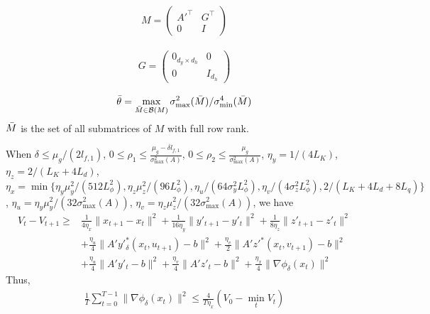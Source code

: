 \documentclass[10pt,a4paper]{amsart}
\begin{document}
\begin{lemma}
\begin{align*}
   M =
    \begin{pmatrix}
        A'^\top & G^\top \\
        0 & I
    \end{pmatrix}
\end{align*}

\begin{align*}
   G =
    \begin{pmatrix}
        0_{d_y\times d_h} & 0 \\
        0 & I_{d_h}
    \end{pmatrix}
\end{align*}

\begin{align*}
    \Bar{\theta}=\max_{\Bar{M}\in \mathcal{B}(M)}\sigma^2_{\max}(\Bar{M})/\sigma^4_{\min}(\Bar{M})
\end{align*}
$\Bar{M}$ is the set of all submatrices of $M$ with full row rank.
\end{lemma}

\begin{lemma}
    When  $\delta\leq \mu_g/(2l_{f,1})$, $0\leq \rho_1\leq \frac{\mu_g-\delta l_{f,1}}{\sigma_{\max}^2(A)}$, $0\leq \rho_2\leq \frac{\mu_g}{\sigma_{\max}^2(A)}$, $\eta_y=1/(4L_K)$, $\eta_z=2/(L_K+4L_d)$, $\eta_x=\min\{\eta_y\mu_y^2/(512L_\phi^2), \eta_z\mu_z^2/(96L_\phi^2), \eta_u/(64\sigma_y^2L_\phi^2), \eta_v/(4\sigma_z^2L_\phi^2), 2/(L_K+4L_d+8L_q)\}$, $\eta_u=\eta_y\mu_y^2/(32\sigma_{\max}^2(A))$, $\eta_v=\eta_z\mu_z^2/(32\sigma_{\max}^2(A))$, we have
\begin{align*}\nonumber
    V_t-V_{t+1}\geq&\frac{1}{4\eta_x}\|x_{t+1}-x_t\|^2+\frac{1}{16\eta_y}\|y'_{t+1}-y'_t\|^2+\frac{1}{8\eta_z}\|z'_{t+1}-z'_t\|^2\\ \nonumber
    &+\frac{\eta_u}{4}\|A'y'^*_\delta(x_t,u_{t+1})-b\|^2+\frac{\eta_v}{2}\|A'z'^*(x_t,v_{t+1})-b\|^2\\ 
    &+\frac{\eta_u}{4}\|A'y'_t-b\|^2+\frac{\eta_v}{4}\|A'z'_t-b\|^2+\frac{\eta_x}{4}\|\nabla \phi_\delta(x_t)\|^2
\end{align*}
Thus,
     \begin{align}
        \frac{1}{T}\sum_{t=0}^{T-1}\|\nabla \phi_\delta(x_{t})\|^2\leq \frac{4}{T\eta_x}(V_0-\min_tV_t )
    \end{align}  
\end{lemma}
\end{document}
